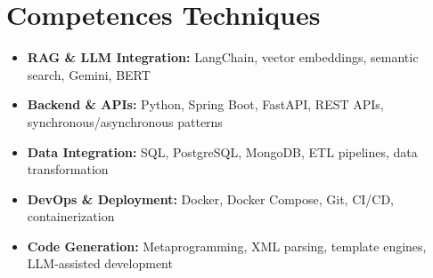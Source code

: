 \documentclass[a4paper,11pt]{article}
\begin{document}
\section{Competences Techniques}
\begin{itemize}[leftmargin=*, nosep]
    \item \small{\textbf{RAG \& LLM Integration:} LangChain, vector embeddings, semantic search, Gemini, BERT}
    \item \small{\textbf{Backend \& APIs:} Python, Spring Boot, FastAPI, REST APIs, synchronous/asynchronous patterns}
    \item \small{\textbf{Data Integration:} SQL, PostgreSQL, MongoDB, ETL pipelines, data transformation}
    \item \small{\textbf{DevOps \& Deployment:} Docker, Docker Compose, Git, CI/CD, containerization}
    \item \small{\textbf{Code Generation:} Metaprogramming, XML parsing, template engines, LLM-assisted development}
\end{itemize}
\end{document}
